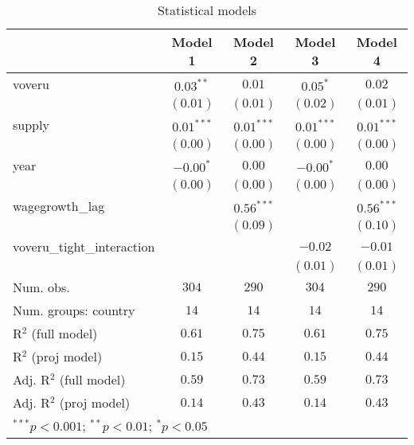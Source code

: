 
\begin{table}
\begin{center}
\begin{tabular}{l c c c c}
\hline
 & Model 1 & Model 2 & Model 3 & Model 4 \\
\hline
voveru                     & $0.03^{**}$  & $0.01$       & $0.05^{*}$   & $0.02$       \\
                           & $(0.01)$     & $(0.01)$     & $(0.02)$     & $(0.01)$     \\
supply                     & $0.01^{***}$ & $0.01^{***}$ & $0.01^{***}$ & $0.01^{***}$ \\
                           & $(0.00)$     & $(0.00)$     & $(0.00)$     & $(0.00)$     \\
year                       & $-0.00^{*}$  & $0.00$       & $-0.00^{*}$  & $0.00$       \\
                           & $(0.00)$     & $(0.00)$     & $(0.00)$     & $(0.00)$     \\
wagegrowth\_lag            &              & $0.56^{***}$ &              & $0.56^{***}$ \\
                           &              & $(0.09)$     &              & $(0.10)$     \\
voveru\_tight\_interaction &              &              & $-0.02$      & $-0.01$      \\
                           &              &              & $(0.01)$     & $(0.01)$     \\
\hline
Num. obs.                  & $304$        & $290$        & $304$        & $290$        \\
Num. groups: country       & $14$         & $14$         & $14$         & $14$         \\
R$^2$ (full model)         & $0.61$       & $0.75$       & $0.61$       & $0.75$       \\
R$^2$ (proj model)         & $0.15$       & $0.44$       & $0.15$       & $0.44$       \\
Adj. R$^2$ (full model)    & $0.59$       & $0.73$       & $0.59$       & $0.73$       \\
Adj. R$^2$ (proj model)    & $0.14$       & $0.43$       & $0.14$       & $0.43$       \\
\hline
\multicolumn{5}{l}{\scriptsize{$^{***}p<0.001$; $^{**}p<0.01$; $^{*}p<0.05$}}
\end{tabular}
\caption{Statistical models}
\label{table:coefficients}
\end{center}
\end{table}
